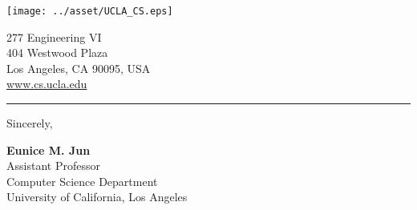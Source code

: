 \documentclass[11pt, a4paper, hidelinks]{letter} %
\begin{document}
\begin{minipage}{0.6\textwidth}
\vspace{-17mm}
\texttt{[image: ../asset/UCLA\_CS.eps]}\\
\end{minipage}
\hfill
\begin{minipage}{0.3\textwidth}\raggedright
\vspace{-20mm}
\footnotesize{
277 Engineering VI\\
404 Westwood Plaza\\
Los Angeles, CA 90095, USA \\
\url{www.cs.ucla.edu}}
\end{minipage}
\hrule
\vspace{3mm}
\rightline{\today}





\vspace{+2mm}
Sincerely,
\vspace{10pt}
\vspace{10pt}


\textbf{Eunice M. Jun}\\
Assistant Professor\\
Computer Science Department \\
University of California, Los Angeles
\end{document}
